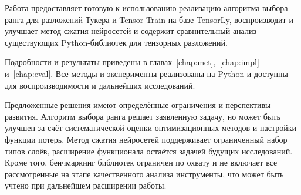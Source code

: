 Работа предоставляет готовую к использованию реализацию алгоритма выбора ранга для разложений Тукера и Tensor-Train на базе TensorLy, воспроизводит и улучшает метод сжатия нейросетей и содержит сравнительный анализ существующих Python-библиотек для тензорных разложений.

Подробности и результаты приведены в главах~\ref{chap:met},~\ref{chap:impl} и~\ref{chap:eval}. Все методы и эксперименты реализованы на Python и доступны для воспроизводимости и дальнейших исследований.

Предложенные решения имеют определённые ограничения и перспективы развития. Алгоритм выбора ранга решает заявленную задачу, но может быть улучшен за счёт систематической оценки оптимизационных методов и настройки функции потерь. Метод сжатия нейросетей поддерживает ограниченный набор типов слоёв, расширение функционала остаётся задачей будущих исследований. Кроме того, бенчмаркинг библиотек ограничен по охвату и не включает все рассмотренные на этапе качественного анализа инструменты, что может быть учтено при дальнейшем расширении работы.

